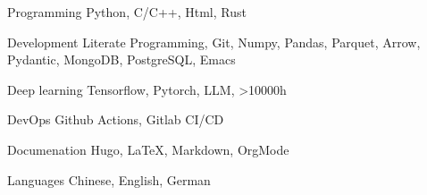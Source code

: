\documentclass[../cv.tex]{subfiles}
\begin{document}


\begin{cvskills}

  \cvskill
    {Programming} %
    {Python, C/C++, Html, Rust} %

  \cvskill
    {Development} %
    {Literate Programming, Git, Numpy, Pandas, Parquet, Arrow, Pydantic, MongoDB, PostgreSQL, Emacs} %

  \cvskill
    {Deep learning} %
    {Tensorflow, Pytorch, LLM, >10000h} %

  \cvskill
    {DevOps} %
    {Github Actions, Gitlab CI/CD} %

  \cvskill
    {Documenation} %
    {Hugo, LaTeX, Markdown, OrgMode} %

  \cvskill
    {Languages} %
    {Chinese, English, German} %

\end{cvskills}
\end{document}
